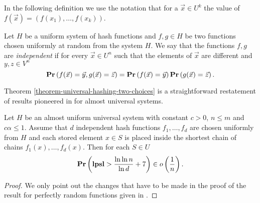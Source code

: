 In the following definition we use the notation that for a $\vec{x} \in U^k$ the value of $f(\vec{x}) = (f(x_1), \dots, f(x_k))$.
\begin{definition}
\label{definition-independent-hash-functions}
Let $H$ be a uniform system of hash functions and $f, g \in H$ be two functions chosen uniformly at random from the system $H$. We say that the functions $f, g$ are \emph{independent} if for every $\vec{x} \in U^n$ such that the elements of $\vec{x}$ are different and $y, z \in V^n$ $$\mathbf{Pr}\left(f(\vec{x}) = \vec{y}, g(\vec{x}) = \vec{z}\right) = \mathbf{Pr}\left(f(\vec{x}) = \vec{y}\right) \mathbf{Pr}\left(g(\vec{x}) = \vec{z}\right).$$
\end{definition}

Theorem \ref{theorem-universal-hashing-two-choices} is a straightforward restatement of results pioneered in \cite{DBLP:conf/stoc/AzarBKU94} for almost universal systems.

\begin{theorem}
\label{theorem-universal-hashing-two-choices}
Let $H$ be an almost uniform universal system with constant $c > 0$, $n \leq m$ and $c \alpha \leq 1$. Assume that $d$ independent hash functions $f_1, \dots, f_d$ are chosen uniformly from $H$ and each stored element $x \in S$ is placed inside the shortest chain of chains $f_1(x), \dots, f_d(x)$. Then for each $S \in U$ $$\mathbf{Pr}\left(\mathbf{lpsl} > \frac{\ln \ln n}{\ln d} + 7\right) \in o\left(\frac{1}{n}\right).$$
\end{theorem}
\begin{proof}
We only point out the changes that have to be made in the proof of the result for perfectly random functions given in \cite{Mitzenmacher:2005:PCR:1076315}. 
\end{proof}
